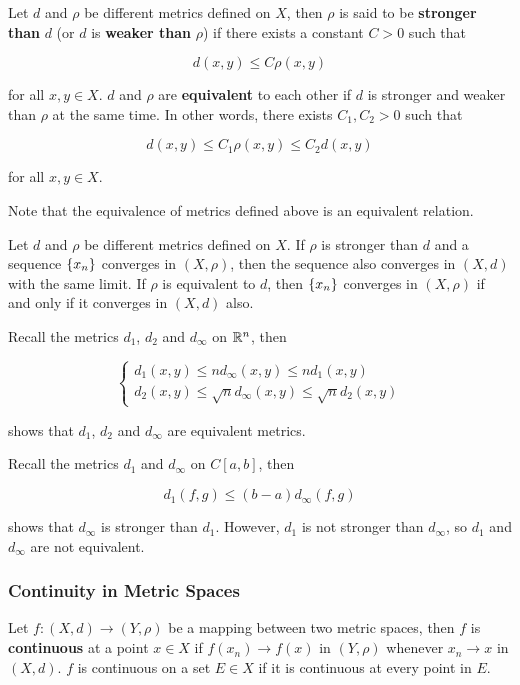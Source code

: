 \documentclass[a4paper,12pt]{article}
\begin{document}
\begin{dft}
  Let $d$ and $\rho$ be different metrics defined on $X$, then $\rho$ is said to be \textbf{stronger than} $d$ (or $d$ is \textbf{weaker than} $\rho$) if there exists a constant $C>0$ such that

  $$d(x,y)\leq C\rho(x,y)$$\s
  
  for all $x,y\in X$. $d$ and $\rho$ are \textbf{equivalent} to each other if $d$ is stronger and weaker than $\rho$ at the same time. In other words, there exists $C_{1},C_{2}>0$ such that

  $$d(x,y)\leq C_{1}\rho(x,y)\leq C_{2}d(x,y)$$\s

  for all $x,y\in X$.
\end{dft}\n

Note that the equivalence of metrics defined above is an equivalent relation.\n

\begin{pst}
  Let $d$ and $\rho$ be different metrics defined on $X$. If $\rho$ is stronger than $d$ and a sequence $\left\{ x_{n}\right\}$ converges in $(X,\rho)$, then the sequence also converges in $(X,d)$ with the same limit. If $\rho$ is equivalent to $d$, then $\left\{ x_{n}\right\}$ converges in $(X,\rho)$ if and only if it converges in $(X,d)$ also.
\end{pst}\n

\begin{exm}
  Recall the metrics $d_{1}$, $d_{2}$ and $d_{\infty}$ on $\mathbb{R}^{n}$, then

  $$\begin{cases}
    d_{1}(x,y)\leq nd_{\infty}(x,y)\leq nd_{1}(x,y)\\
    d_{2}(x,y)\leq\sqrt{n}d_{\infty}(x,y)\leq\sqrt{n}d_{2}(x,y)
  \end{cases}$$\s

  shows that $d_{1}$, $d_{2}$ and $d_{\infty}$ are equivalent metrics.
\end{exm}\n

\begin{exm}
  Recall the metrics $d_{1}$ and $d_{\infty}$ on $C[a,b]$, then

  $$d_{1}(f,g)\leq(b-a)d_{\infty}(f,g)$$\s

  shows that $d_{\infty}$ is stronger than $d_{1}$. However, $d_{1}$ is not stronger than $d_{\infty}$, so $d_{1}$ and $d_{\infty}$ are not equivalent.
\end{exm}

\subsubsection{Continuity in Metric Spaces}
\begin{dft}
  Let $f:(X,d)\to(Y,\rho)$ be a mapping between two metric spaces, then $f$ is \textbf{continuous} at a point $x\in X$ if $f(x_{n})\to f(x)$ in $(Y,\rho)$ whenever $x_{n}\to x$ in $(X,d)$. $f$ is continuous on a set $E\in X$ if it is continuous at every point in $E$.
\end{dft}\n
\end{document}
